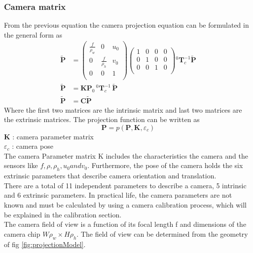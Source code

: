 \documentclass[journal,final,a4paper,twoside]{PS}
\begin{document}
\subsubsection{Camera matrix}
\label{sec:camMatrix}
From the previous equation the camera projection equation can be formulated in the general form as
\begin{subequations}\begin{align}
\tilde{\textbf{P}}&= \begin{pmatrix}
\frac{f}{\rho_w}&0&u_0\\
0&\frac{f}{\rho_h}&v_0\\
0&0&1\\
\end{pmatrix}\begin{pmatrix}
1&0&0&0\\
0&1&0&0\\
0&0&1&0\\
\end{pmatrix}{}^{0}\textbf{T}_c^{-1}\tilde{\textbf{P}}\\
\tilde{\textbf{P}}&= \textbf{K}\textbf{P}_0 \,{}^{0}\textbf{T}^{-1}_c\,\tilde{\textbf{P}}\\
\tilde{\textbf{P}}&= \textbf{C}\tilde{\textbf{P}}
\end{align}
\end{subequations}
Where the first two matrices are the intrinsic matrix and last two matrices are the extrinsic matrices.
The projection function can be written as\cite{Corke}
\begin{equation}
\textbf{P}=p(\textbf{P},\textbf{K},\varepsilon_c)
\end{equation}
$\textbf{K}$ : camera parameter matrix
\\
$\varepsilon_c$ : camera pose\\
The camera Parameter matrix K includes the characteristics the camera and the sensors like $f,\rho,\rho_h,u_0  and v_0$. Furthermore, the pose of the camera holds the six extrinsic parameters that describe camera orientation and translation.
\\
There are a total of 11 independent parameters to describe a camera, 5 intrinsic and 6 extrinsic parameters. In practical life, the camera parameters are not known and must be calculated by using a camera calibration process, which will be explained in the calibration section.
\\
The camera field of view is a function of its focal length f  and dimensions of the camera chip $W\rho_w  \times  H\rho_h$. The field of view can be determined from the geometry of fig \ref{fig:projectionModel}.
\end{document}
